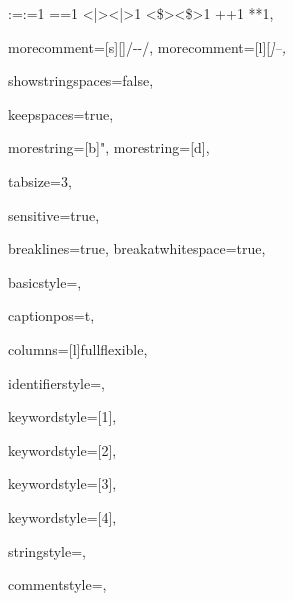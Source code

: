 {{:=}{{\color{symbolcolor}:=}}1
{=}{{\color{symbolcolor}=}}1
{<|>}{{\color{symbolcolor}<|>}}1
{<\$>}{{\color{symbolcolor}<\$>}}1
{+}{{\color{symbolcolor}+}}1
{*}{{\color{symbolcolor}*}}1,

morecomment=[s][\color{commentcolor}]{/-}{-/},
morecomment=[l][\itshape \color{commentcolor}]{--},

showstringspaces=false,

keepspaces=true,

morestring=[b]",
morestring=[d],

tabsize=3,


sensitive=true,

breaklines=true,
breakatwhitespace=true,

basicstyle=\ttfamily\footnotesize,

captionpos=t,

columns=[l]fullflexible,


identifierstyle={\ttfamily\color{black}},

keywordstyle=[1]{\ttfamily\color{keywordcolor}},

keywordstyle=[2]{\ttfamily\color{sortcolor}},

keywordstyle=[3]{\ttfamily\color{tacticcolor}},

keywordstyle=[4]{\ttfamily\color{attributecolor}},

stringstyle=\ttfamily,

commentstyle={\ttfamily\footnotesize },

}
